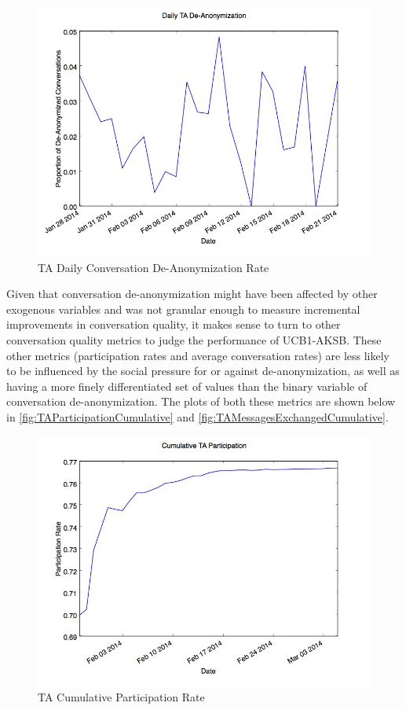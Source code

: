 \begin{figure}[H]
\centering
\includegraphics[trim= 0mm 0mm 0mm 0mm, clip, scale=0.5]{./Figures/DailyTADe-Anonymization.jpg}
\caption{TA Daily Conversation De-Anonymization Rate}
\label{fig:TADe-AnonymizationDaily}
\end{figure}

Given that conversation de-anonymization might have been affected by other exogenous variables and was not granular enough to measure incremental improvements in conversation quality, it makes sense to turn to other conversation quality metrics to judge the performance of UCB1-AKSB. These other metrics (participation rates and average conversation rates) are less likely to be influenced by the social pressure for or against de-anonymization, as well as having a more finely differentiated set of values than the binary variable of conversation de-anonymization. The plots of both these metrics are shown below in \autoref{fig:TAParticipationCumulative} and \autoref{fig:TAMessagesExchangedCumulative}.

\begin{figure}[H]
\centering
\includegraphics[trim= 0mm 0mm 0mm 0mm, clip, scale=0.5]{./Figures/CumulativeTAParticipation.jpg}
\caption{TA Cumulative Participation Rate}
\label{fig:TAParticipationCumulative}
\end{figure}

